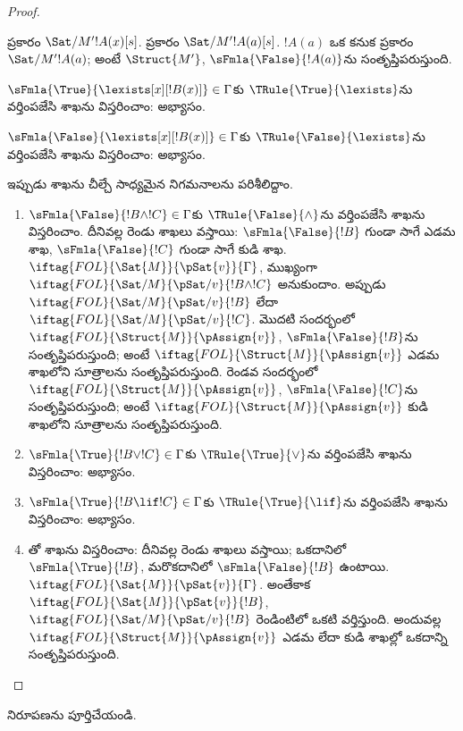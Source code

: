 \documentclass[../../../include/open-logic-section]{subfiles}
\begin{document}
\begin{proof}
\begin{enumerate}
{   ప్రకారం
  $\Sat/{M'}{!A(x)}[s]$.  ప్రకారం
  $\Sat/{M'}{!A(a)}[s]$. $!A(a)$ ఒక  కనుక
   ప్రకారం
  $\Sat/{M'}{!A(a)}$; అంటే $\Struct{M'}$,
  $\sFmla{\False}{!A(a)}$ను సంతృప్తిపరుస్తుంది.
\item $\sFmla{\True}{\lexists[x][!B(x)]} \in \Gamma$కు
  $\TRule{\True}{\lexists}$ను వర్తింపజేసి శాఖను విస్తరించాం: అభ్యాసం.
\item $\sFmla{\False}{\lexists[x][!B(x)]} \in \Gamma$కు
  $\TRule{\False}{\lexists}$ను వర్తింపజేసి శాఖను విస్తరించాం: అభ్యాసం.}{}
\end{enumerate}
ఇప్పుడు శాఖను చీల్చే సాధ్యమైన నిగమనాలను పరిశీలిద్దాం.
\begin{enumerate}
\item $\sFmla{\False}{!B \land !C} \in \Gamma$కు
  $\TRule{\False}{\land}$ను వర్తింపజేసి శాఖను విస్తరించాం. దీనివల్ల
  రెండు శాఖలు వస్తాయి: $\sFmla{\False}{!B}$ గుండా సాగే ఎడమ శాఖ,
  $\sFmla{\False}{!C}$ గుండా సాగే కుడి శాఖ.
  $\iftag{FOL}{\Sat{M}}{\pSat{v}}{\Gamma}$, ముఖ్యంగా
  $\iftag{FOL}{\Sat/{M}}{\pSat/{v}}{!B \land !C}$ అనుకుందాం. అప్పుడు
  $\iftag{FOL}{\Sat/{M}}{\pSat/{v}}{!B}$ లేదా
  $\iftag{FOL}{\Sat/{M}}{\pSat/{v}}{!C}$. మొదటి సందర్భంలో
  $\iftag{FOL}{\Struct{M}}{\pAssign{v}}$,
  $\sFmla{\False}{!B}$ను సంతృప్తిపరుస్తుంది; అంటే
  $\iftag{FOL}{\Struct{M}}{\pAssign{v}}$ ఎడమ శాఖలోని సూత్రాలను
  సంతృప్తిపరుస్తుంది. రెండవ సందర్భంలో
  $\iftag{FOL}{\Struct{M}}{\pAssign{v}}$,
  $\sFmla{\False}{!C}$ను సంతృప్తిపరుస్తుంది; అంటే
  $\iftag{FOL}{\Struct{M}}{\pAssign{v}}$ కుడి శాఖలోని సూత్రాలను
  సంతృప్తిపరుస్తుంది.
\item $\sFmla{\True}{!B \lor !C} \in \Gamma$కు
  $\TRule{\True}{\lor}$ను వర్తింపజేసి శాఖను విస్తరించాం: అభ్యాసం.
\item $\sFmla{\True}{!B \lif !C} \in \Gamma$కు
  $\TRule{\True}{\lif}$ను వర్తింపజేసి శాఖను విస్తరించాం: అభ్యాసం.
\item \Cut{}తో శాఖను విస్తరించాం: దీనివల్ల రెండు శాఖలు వస్తాయి;
  ఒకదానిలో $\sFmla{\True}{!B}$, మరొకదానిలో
  $\sFmla{\False}{!B}$ ఉంటాయి. $\iftag{FOL}{\Sat{M}}{\pSat{v}}{\Gamma}$.
  అంతేకాక $\iftag{FOL}{\Sat{M}}{\pSat{v}}{!B}$,
  $\iftag{FOL}{\Sat/{M}}{\pSat/{v}}{!B}$ రెండింటిలో ఒకటి వర్తిస్తుంది. అందువల్ల
  $\iftag{FOL}{\Struct{M}}{\pAssign{v}}$ ఎడమ లేదా కుడి శాఖల్లో
  ఒకదాన్ని సంతృప్తిపరుస్తుంది.
\end{enumerate}
\end{proof}

\begin{prob}
 నిరూపణను పూర్తిచేయండి.
\end{prob}
\tagendprob
\end{document}
